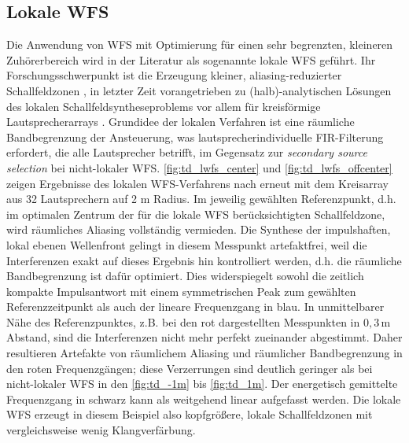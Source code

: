 \subsection{Lokale WFS}
%
Die Anwendung von WFS mit Optimierung für einen sehr
begrenzten, kleineren Zuhörerbereich wird in der Literatur als sogenannte
lokale WFS geführt.
%
Ihr Forschungsschwerpunkt ist die Erzeugung kleiner, aliasing-reduzierter
Schallfeldzonen \cite{Corteel2008_AES}, in letzter Zeit vorangetrieben zu
(halb)-analytischen Lösungen des lokalen Schallfeldsyntheseproblems vor allem für
kreisförmige Lautsprecherarrays \cite{Winter2019_diss,Hahn2019,Hahn2022_JAES}.
%
Grundidee der lokalen Verfahren ist eine räumliche Bandbegrenzung der Ansteuerung,
was lautsprecherindividuelle FIR-Filterung erfordert,
die alle Lautsprecher betrifft, im Gegensatz zur \textit{secondary source selection}
bei nicht-lokaler WFS.
%
\Abb\ref{fig:td_lwfs_center} und \ref{fig:td_lwfs_offcenter} zeigen Ergebnisse
des lokalen WFS-Verfahrens nach \cite{Hahn2022_JAES} erneut mit dem Kreisarray aus
32 Lautsprechern auf 2 m Radius.
%
Im jeweilig gewählten Referenzpunkt,
d.h. im optimalen Zentrum der für die lokale WFS berücksichtigten Schallfeldzone,
wird räumliches Aliasing vollständig vermieden.
%
Die Synthese der impulshaften, lokal ebenen Wellenfront gelingt in diesem Messpunkt
artefaktfrei, weil die Interferenzen exakt auf dieses Ergebnis hin
kontrolliert werden, d.h. die räumliche Bandbegrenzung ist dafür optimiert.
%
Dies widerspiegelt sowohl die zeitlich kompakte Impulsantwort mit einem
symmetrischen Peak zum gewählten Referenzzeitpunkt als auch der lineare Frequenzgang
in blau.
%
In unmittelbarer Nähe des Referenzpunktes, z.B. bei den rot dargestellten Messpunkten
in $0{,}3$\,m Abstand, sind die Interferenzen nicht mehr perfekt zueinander abgestimmt.
%
Daher resultieren Artefakte von räumlichem Aliasing und räumlicher Bandbegrenzung
in den roten Frequenzgängen; diese
Verzerrungen sind deutlich geringer als bei nicht-lokaler WFS in den
\Abb\ref{fig:td_-1m} bis \ref{fig:td_1m}.
%
Der energetisch gemittelte Frequenzgang in schwarz kann als weitgehend linear
aufgefasst werden.
%
Die lokale WFS erzeugt in diesem Beispiel also kopfgrößere, lokale
Schallfeldzonen mit vergleichsweise wenig Klangverfärbung.
%
